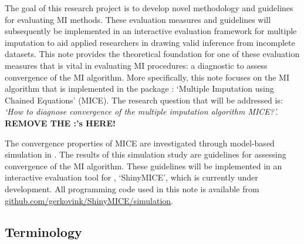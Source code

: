 \documentclass[article]{jss}
\begin{document}
The goal of this research project is to develop novel methodology and guidelines for evaluating MI methods. These evaluation measures and guidelines will subsequently be implemented in an interactive evaluation framework for multiple imputation to aid applied researchers in drawing valid inference from incomplete datasets. This note provides the theoretical foundation for one of these evaluation measures that is vital in evaluating MI procedures: a diagnostic to assess convergence of the MI algorithm. More specifically, this note focuses on the MI algorithm that is implemented in the  package : `Multiple Imputation using Chained Equations' (MICE). The research question that will be addressed is: %
\emph{`How to diagnose convergence of the multiple imputation algorithm MICE?'.} \textbf{REMOVE THE :'s HERE!}

The convergence properties of MICE are investigated through model-based simulation in  \citep{R}. The results of this simulation study are guidelines for assessing convergence of the MI algorithm. These guidelines will be implemented in an interactive evaluation tool for , `ShinyMICE', which is currently under development. All programming code used in this note is available from \href{https://github.com/gerkovink/shinyMice/simulation}{github.com/gerkovink/ShinyMICE/simulation}. 


\subsection{Terminology} \label{sec:terms}
\end{document}
